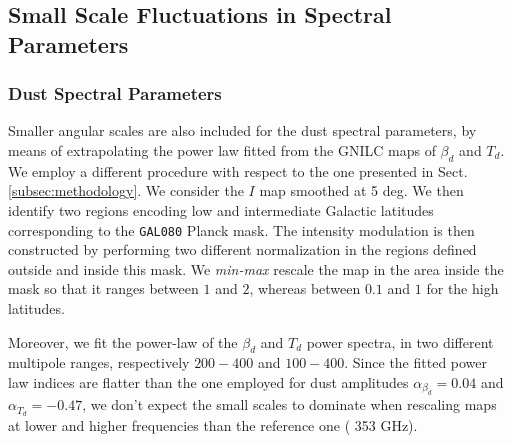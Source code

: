 \subsection{Small Scale Fluctuations in Spectral Parameters}

\subsubsection{Dust Spectral Parameters}
Smaller angular scales are also included for the dust spectral parameters, by means of extrapolating the power law fitted from the GNILC maps of $\beta_d$ and $T_d$.  We employ a different procedure with respect to the one presented in Sect. \ref{subsec:methodology}.  
We consider the $I$ map smoothed  at 5 deg.  We then identify two  regions encoding  low and intermediate Galactic latitudes corresponding to the  \texttt{GAL080} Planck mask.  The  intensity modulation is then constructed by performing two different normalization in the regions defined outside and inside  this mask.  We \emph{min-max} rescale the map in the area inside the mask so that it  ranges   between $1$ and $2$, whereas    between $0.1$ and $1$ for the high latitudes.

Moreover, we fit the power-law of the $\beta_d$ and $T_d$ power  spectra, in two different multipole ranges, respectively $200-400$ and $100-400$.  Since the fitted power law  indices are  flatter than the one employed for dust amplitudes  $\alpha_{\beta_d}= 0.04$ and $\alpha_{T_d} = -0.47$, we don't expect the  small scales to dominate when rescaling maps at lower and higher frequencies than the reference one ( 353 GHz). 


 
